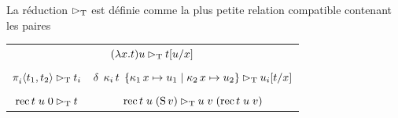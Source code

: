 \begin{definition}[Réduction]
  La réduction $\STred$ est définie comme la plus petite relation compatible
  contenant les paires
  \begin{center}
    \begin{tabular}{cc}
      \multicolumn{2}{c}{$(\lambda x.t)u\rhd_{\mathrm{T}} t[u/x]$}
      \\
      \\
      $\mathop{\pi_{i}^{}}\langle t_1,t_2\rangle \rhd_{\mathrm{T}} t_i$
      &
      $\delta\;\mathop{\kappa_{i}}t\;\left\{\mathop{\kappa_{1}} x\mapsto u_1 \;\middle\vert\; \mathop{\kappa_{2}} x\mapsto u_2\right\}\rhd_{\mathrm{T}} u_i[t/x]$
      \\
      \\
      $\operatorname{rec} t\;u\;0\rhd_{\mathrm{T}} t$
      &
      $\operatorname{rec} t\;u\;(\operatorname{S} v)\rhd_{\mathrm{T}} u\;v\;(\operatorname{rec} t\;u\;v)$
    \end{tabular}
  \end{center}
  \index[notation]{$\STred$}
\end{definition}

